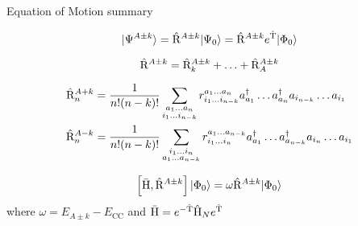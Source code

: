 \begin{frame}{Equation of Motion summary}

    \begin{equation*}
        |\Psi^{A\pm k}\rangle = \hat{\mathrm{R}}^{A\pm k} |\Psi_0\rangle = \hat{\mathrm{R}}^{A\pm k} e^{\hat{\mathrm{T}}} |\Phi_0\rangle
    \end{equation*}

    \begin{equation*}
        \hat{\mathrm{R}}^{A\pm k} = \hat{\mathrm{R}}^{A\pm k}_k + \ldots + \hat{\mathrm{R}}^{A\pm k}_A
    \end{equation*}

    \begin{align*}
        \hat{\mathrm{R}}^{A + k}_n &= \frac{1}{n!(n-k)!} \sum_{\substack{
            a_1 \ldots a_n \\
            i_1 \ldots i_{n-k}}}
            r^{a_1 \ldots a_n}_{i_1 \ldots i_{n-k}} 
            a_{a_1}^\dagger \ldots a_{a_n}^\dagger a_{i_{n-k}} \ldots a_{i_1} \notag \\
        \hat{\mathrm{R}}^{A - k}_n &= \frac{1}{n!(n-k)!} \sum_{\substack{
            i_1 \ldots i_n \\
            a_1 \ldots a_{n-k}}}
            r^{a_1 \ldots a_{n-k}}_{i_1 \ldots i_{n}} 
            a_{a_1}^\dagger \ldots a_{a_{n-k}}^\dagger a_{i_{n}} \ldots a_{i_1}
    \end{align*}

    \begin{equation*}
        \left[ \bar{\mathrm{H}}, \hat{\mathrm{R}}^{A\pm k} \right] |\Phi_0\rangle = \omega \hat{\mathrm{R}}^{A\pm k} |\Phi_0\rangle
    \end{equation*}
    where $\omega = E_{A\pm k} - E_{\mathrm{CC}}$ and $\bar{\mathrm{H}} = e^{-\hat{\mathrm{T}}}\hat{\mathrm{H}}_N e^{\hat{\mathrm{T}}}$
    


\end{frame}

    

